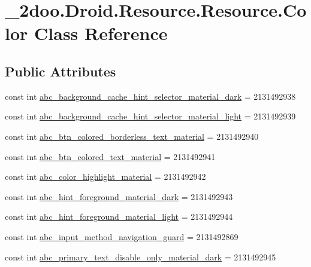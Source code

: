 \hypertarget{class__2doo_1_1_droid_1_1_resource_1_1_color}{
\section{\_\-2doo.Droid.Resource.Resource.Color Class Reference}
\label{class__2doo_1_1_droid_1_1_resource_1_1_color}
}
\subsection*{Public Attributes}
\begin{CompactItemize}
\item 
const int \hyperlink{class__2doo_1_1_droid_1_1_resource_1_1_color_7806be9f08f26dbab6984d66d5bfe4da}{abc\_\-background\_\-cache\_\-hint\_\-selector\_\-material\_\-dark} = 2131492938
\item 
const int \hyperlink{class__2doo_1_1_droid_1_1_resource_1_1_color_1d33086303f704c882d02ad7a4d6999e}{abc\_\-background\_\-cache\_\-hint\_\-selector\_\-material\_\-light} = 2131492939
\item 
const int \hyperlink{class__2doo_1_1_droid_1_1_resource_1_1_color_5bbd5886a30e7da217fed4dacf32c9ce}{abc\_\-btn\_\-colored\_\-borderless\_\-text\_\-material} = 2131492940
\item 
const int \hyperlink{class__2doo_1_1_droid_1_1_resource_1_1_color_3c1d998595ec7f0ebadf335d3bcc5796}{abc\_\-btn\_\-colored\_\-text\_\-material} = 2131492941
\item 
const int \hyperlink{class__2doo_1_1_droid_1_1_resource_1_1_color_d637badbd0527e634a227d84198473fb}{abc\_\-color\_\-highlight\_\-material} = 2131492942
\item 
const int \hyperlink{class__2doo_1_1_droid_1_1_resource_1_1_color_a87bcd0715c9627a0e1dfede0afbb5be}{abc\_\-hint\_\-foreground\_\-material\_\-dark} = 2131492943
\item 
const int \hyperlink{class__2doo_1_1_droid_1_1_resource_1_1_color_e74a73f440d9f2a1d848644d465439e4}{abc\_\-hint\_\-foreground\_\-material\_\-light} = 2131492944
\item 
const int \hyperlink{class__2doo_1_1_droid_1_1_resource_1_1_color_7a71f534787fa8aeee3cd9f6a4e73ac4}{abc\_\-input\_\-method\_\-navigation\_\-guard} = 2131492869
\item 
const int \hyperlink{class__2doo_1_1_droid_1_1_resource_1_1_color_22a422d331ddc73f7cb572afbcfab006}{abc\_\-primary\_\-text\_\-disable\_\-only\_\-material\_\-dark} = 2131492945
\item 

\end{CompactItemize}
